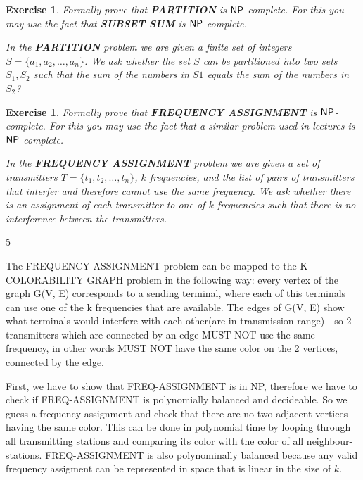 \documentclass [11pt]{article}
\newtheorem{exercise}[theorem]{Exercise}
\newcommand{\ccfont}[1]{\protect\mathsf{#1}}
\newcommand{\NP}{\ccfont{NP}}
\newcommand{\solution}[1]{\noindent {\bf Solution.}  #1}
\begin{document}
\begin{exercise}
  \label{ex:partition}
  Formally prove that \textbf{PARTITION} is $\NP$-complete. For this you may use
  the fact that \textbf{SUBSET SUM} is $\NP$-complete.   
  
  \smallskip
  \noindent In the \textbf{PARTITION} problem we are given a finite set of integers $S=\{a_1, a_2, \ldots, a_n\}$. We ask whether the set $S$ can be partitioned into two sets $S_1, S_2$ such that the sum of the numbers in $S1$ equals the sum of the numbers in $S_2$? 
  

\end{exercise}


\solution




\begin{exercise}
  \label{ex:frequency}
  Formally prove that \textbf{FREQUENCY ASSIGNMENT} is $\NP$-complete. For this you may use
  the fact that a similar problem used in lectures is $\NP$-complete.
      
    \smallskip
        
  \noindent In the \textbf{FREQUENCY ASSIGNMENT} problem we are given a set of transmitters $T=\{t_1, t_2, \ldots, t_n\}$,  $k$ frequencies, and the list of pairs of transmitters that interfer and therefore cannot use the same frequency. We ask whether there is an assignment of each transmitter to one of $k$ frequencies such that there is no interference between the transmitters. 
            
\end{exercise}

\solution{ 5}

The FREQUENCY ASSIGNMENT problem can be mapped to the K-COLORABILITY GRAPH problem in the following way: every vertex of the graph G(V, E) corresponds to a sending terminal, where each of this terminals can use one of the k frequencies that are available. The edges of G(V, E) show what terminals would interfere with each other(are in transmission range) - so 2 transmitters which are connected by  an edge MUST NOT use the same frequency, in other words MUST NOT have the same color on the 2 vertices, connected by the edge.

First, we have to show that FREQ-ASSIGNMENT is in NP, therefore we have to check if FREQ-ASSIGNMENT is polynomially balanced and decideable. So we guess a frequency assignment and check that there are no two adjacent vertices having the same color. This can be done in polynomial time by looping through all transmitting stations and comparing its color with the color of all neighbour-stations. FREQ-ASSIGNMENT is also polynominally balanced because any valid frequency assigment can be represented in space that is linear in the size of $k$.
\end{document}
